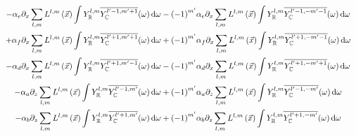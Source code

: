 \documentclass[10pt]{scrartcl}
\begin{document}
\begin{align}
\\
-\alpha_e\partial_x\sum_{l,m}L^{l,m}\left (\vec{x}\right)\int{Y_{\mathbb{R}}^{l,m}\overline{Y_{\mathbb{C}}^{l'-1, m'+1}}(\omega )\,\mathrm{d}\omega}
-\left({-1}\right)^{m'}&\alpha_e\partial_x\sum_{l,m}L^{l,m}\left (\vec{x}\right)\int{Y_{\mathbb{R}}^{l,m}\overline{Y_{\mathbb{C}}^{l'-1, -m'-1}}(\omega )\,\mathrm{d}\omega}
\\
+\alpha_f\partial_x\sum_{l,m}L^{l,m}\left (\vec{x}\right)\int{Y_{\mathbb{R}}^{l,m}\overline{Y_{\mathbb{C}}^{l'+1, m'+1}}(\omega )\,\mathrm{d}\omega}
+\left({-1}\right)^{m'}&\alpha_f\partial_x\sum_{l,m}L^{l,m}\left (\vec{x}\right)\int{Y_{\mathbb{R}}^{l,m}\overline{Y_{\mathbb{C}}^{l'+1, -m'-1}}(\omega )\,\mathrm{d}\omega}
\\
-\alpha_d\partial_x\sum_{l,m}L^{l,m}\left (\vec{x}\right)\int{Y_{\mathbb{R}}^{l,m}\overline{Y_{\mathbb{C}}^{l'+1, m'-1}}(\omega )\,\mathrm{d}\omega}
-\left({-1}\right)^{m'}&\alpha_d\partial_x\sum_{l,m}L^{l,m}\left (\vec{x}\right)\int{Y_{\mathbb{R}}^{l,m}\overline{Y_{\mathbb{C}}^{l'+1, -m'+1}}(\omega )\,\mathrm{d}\omega}
\\
-\alpha_a\partial_z\sum_{l,m}L^{l,m}\left (\vec{x}\right)\int{Y_{\mathbb{R}}^{l,m}\overline{Y_{\mathbb{C}}^{l'-1, m'}}(\omega )\,\mathrm{d}\omega}
+\left({-1}\right)^{m'}&\alpha_a\partial_z\sum_{l,m}L^{l,m}\left (\vec{x}\right)\int{Y_{\mathbb{R}}^{l,m}\overline{Y_{\mathbb{C}}^{l'-1, -m'}}(\omega )\,\mathrm{d}\omega}
\\
-\alpha_b\partial_z\sum_{l,m}L^{l,m}\left (\vec{x}\right)\int{Y_{\mathbb{R}}^{l,m}\overline{Y_{\mathbb{C}}^{l'+1, m'}}(\omega )\,\mathrm{d}\omega}
+\left({-1}\right)^{m'}&\alpha_b\partial_z\sum_{l,m}L^{l,m}\left (\vec{x}\right)\int{Y_{\mathbb{R}}^{l,m}\overline{Y_{\mathbb{C}}^{l'+1, -m'}}(\omega )\,\mathrm{d}\omega}
\end{align}
\end{document}

